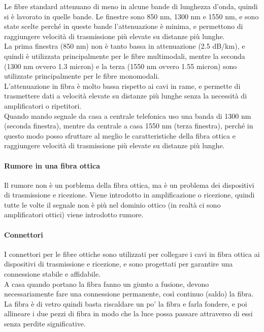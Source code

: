 Le fibre standard attenuano di meno in alcune bande di lunghezza d'onda, quindi si è lavorato in quelle bande. 
Le finestre sono 850 nm, 1300 nm e 1550 nm, e sono state scelte perché in queste bande l'attenuazione è minima, e permettono di raggiungere velocità di trasmissione più elevate su distanze più 
lunghe.\\
La prima finestra (850 nm) non è tanto bassa in attenuazione (2.5 dB/km), e quindi è utilizzata principalmente per le fibre multimodali, mentre la seconda (1300 nm ovvero 1.3 micron) e la terza (1550 nm ovvero 1.55 micron) sono utilizzate 
principalmente per le fibre monomodali.\\

L'attenuazione in fibra è molto bassa rispetto ai cavi in rame, e permette di trasmettere dati a velocità elevate su distanze più lunghe senza la necessità di amplificatori o ripetitori.\\

Quando mando segnale da casa a centrale telefonica uso una banda di 1300 nm (seconda finestra), mentre da centrale a casa 1550 nm (terza finestra), perché in questo modo posso sfruttare al meglio le caratteristiche 
della fibra ottica e raggiungere velocità di trasmissione più elevate su distanze più lunghe.\\
\paragraph{Rumore in una fibra ottica}
Il rumore non è un porblema della fibra ottica, ma è un problema dei dispositivi di trasmissione e ricezione.
Viene introdotto in amplificazione o ricezione, quindi tutte le volte il segnale non è più nel dominio ottico (in realtà ci sono amplificatori ottici) viene introdotto rumore.\\

\paragraph{Connettori}
I connettori per le fibre ottiche sono utilizzati per collegare i cavi in fibra ottica ai dispositivi di trasmissione e ricezione, e sono progettati per garantire una connessione stabile e affidabile.\\
A casa quando portano la fibra fanno un giunto a fusione, devono necessariamente fare una connessione permanente, così continuo (saldo) la fibra. La fibra è di vetro quindi basta riscaldare
un po' la fibra e farla fondere, e poi allineare i due pezzi di fibra in modo che la luce possa passare attraverso di essi senza perdite significative.\\


